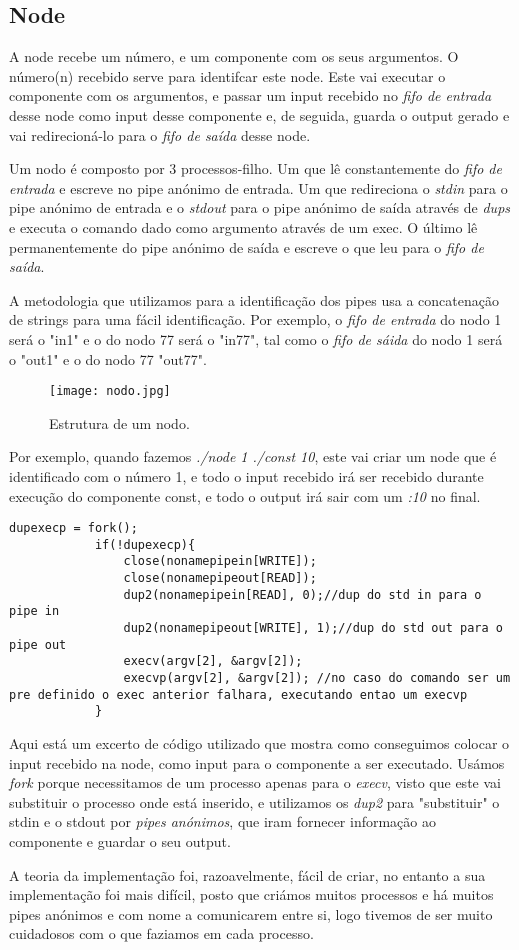 \documentclass{article}
\begin{document}
\subsection{Node}
\par A node recebe um número, e um componente com os seus argumentos. O número(n) recebido serve para identifcar este node. Este vai executar o componente com os argumentos, e passar um input recebido no \emph{fifo de entrada} desse node como input desse componente e, de seguida, guarda o output gerado e vai redirecioná-lo para o \emph{fifo de saída} desse node.
\par Um nodo é composto por 3 processos-filho. Um que lê constantemente do \emph{fifo de entrada} e escreve no pipe anónimo de entrada. Um que redireciona o \emph{stdin} para o pipe anónimo de entrada e o \emph{stdout} para o pipe anónimo de saída através de \emph{dups} e executa o comando dado como argumento através de um exec. O último lê permanentemente do pipe anónimo de saída e escreve o que leu para o \emph{fifo de saída}.
\par A metodologia que utilizamos para a identificação dos pipes usa a concatenação de strings para uma fácil identificação. Por exemplo, o \emph{fifo de entrada} do nodo 1 será o "in1" e o do nodo 77 será o "in77", tal como o \emph{fifo de sáida} do nodo 1 será o "out1" e o do nodo 77 "out77".

\begin{figure}[ht]
\centering
\texttt{[image: nodo.jpg]}
\caption{Estrutura de um nodo.}
\end{figure}

\par Por exemplo, quando fazemos \emph{./node 1 ./const 10}, este vai criar um node que é identificado com o número 1, e todo o input recebido irá ser recebido durante execução do componente const, e todo o output irá sair com um \emph{:10} no final.
\begin{lstlisting}
dupexecp = fork();
			if(!dupexecp){
				close(nonamepipein[WRITE]);
				close(nonamepipeout[READ]);
				dup2(nonamepipein[READ], 0);//dup do std in para o pipe in
				dup2(nonamepipeout[WRITE], 1);//dup do std out para o pipe out
				execv(argv[2], &argv[2]);
				execvp(argv[2], &argv[2]); //no caso do comando ser um pre definido o exec anterior falhara, executando entao um execvp
			}
\end{lstlisting}

\par Aqui está um excerto de código utilizado que mostra como conseguimos colocar o input recebido na node, como input para o componente a ser executado. Usámos \emph{fork} porque necessitamos de um processo apenas para o \emph{execv}, visto que este vai substituir o processo onde está inserido, e utilizamos os \emph{dup2} para "substituir" o stdin e o stdout por \emph{pipes anónimos}, que iram fornecer informação ao componente e guardar o seu output.
\par A teoria da implementação foi, razoavelmente, fácil de criar, no entanto a sua implementação foi mais difícil, posto que criámos muitos processos e há muitos pipes anónimos e com nome a comunicarem entre si, logo tivemos de ser muito cuidadosos com o que faziamos em cada processo.
\end{document}
